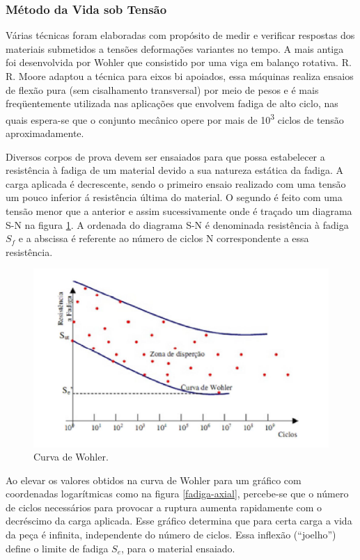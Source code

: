 \subsubsection{Método da Vida sob Tensão}

Várias técnicas foram elaboradas com propósito de medir e verificar respostas dos materiais submetidos a tensões deformações variantes no tempo. A mais antiga foi desenvolvida por Wohler que consistido por uma viga em balanço rotativa. R. R. Moore adaptou a técnica para eixos bi apoiados, essa máquinas realiza ensaios de flexão pura (sem cisalhamento transversal) por meio de pesos e é mais freqüentemente utilizada nas aplicações que envolvem fadiga de alto ciclo, nas quais espera-se que o conjunto mecânico opere por mais de 10\textsuperscript{3} ciclos de tensão aproximadamente.
 
	Diversos corpos de prova devem ser ensaiados para que possa estabelecer a resistência à fadiga de um material devido a sua natureza estática da fadiga. A carga aplicada é decrescente, sendo o primeiro ensaio realizado com uma tensão um pouco inferior á resistência última do material. O segundo é feito com uma tensão menor que a anterior e assim sucessivamente onde é traçado um diagrama S-N na figura \ref{wohler}. A ordenada do diagrama S-N é denominada resistência à fadiga $S_f$ e a abscissa é referente ao número de ciclos N correspondente a essa resistência.
	
\begin{figure}[h]
\centering
\includegraphics[scale=0.8]{figuras/wohler.png}
\caption{Curva de Wohler.}
\label{wohler}
\end{figure}

Ao elevar os valores obtidos na curva de Wohler para um gráfico com coordenadas logarítmicas como na figura \ref{fadiga-axial}, percebe-se que o número de ciclos necessários para provocar a ruptura aumenta rapidamente com o decréscimo da carga aplicada. Esse gráfico determina que para certa carga a vida da peça é infinita, independente do número de ciclos. Essa inflexão (“joelho”) define o limite de fadiga $S_e$, para o material ensaiado.

